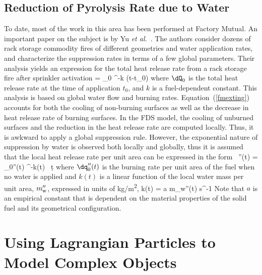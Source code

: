 \subsection{Reduction of Pyrolysis Rate due to Water}

To date, most of the work in this area has been performed at Factory Mutual. An important paper on the subject is by Yu {\em et al.}~\cite{Yu:1}. The authors consider dozens of rack storage commodity fires of different geometries and water application rates, and characterize the suppression rates in terms of a few global parameters. Their analysis yields an expression for the total heat release rate from a rack storage fire after sprinkler activation
\be
   \dQ = \dQ_0 \; ^{-k (t-t_0)}  \label{fmexting}
\ee
where $\dQ_0$ is the total heat release rate at the time of application $t_0$, and $k$ is a fuel-dependent constant. This analysis is based on global water flow and burning rates. Equation~(\ref{fmexting}) accounts for both the cooling of non-burning surfaces as well as the decrease in heat release rate of burning surfaces. In the FDS model, the cooling of unburned surfaces and the reduction in the heat release rate are computed locally. Thus, it is awkward to apply a global suppression rule. However, the exponential nature of suppression by water is observed both locally and globally, thus it is assumed that the local heat release rate per unit area can be expressed in the form~\cite{Hamins:1,Hamins:IAFSS2002}
\be
   \dq''(t) = \dq_0''(t) \; ^{-\int k(t) \, \d t}
\label{nistexting} \ee
where $\dq_0''(t)$ is the burning rate per unit area of the fuel when no water is applied and $k(t)$ is a linear function of the local water mass per unit area, $m_{\rm w}''$, expressed in units of \unit{kg/m^2},
\be
   k(t) = a \; m_{\rm w}''(t) \quad   \hbox{s}^{-1}
\ee
Note that $a$ is an empirical constant that is dependent on the material properties of the solid fuel and its geometrical configuration.



\section{Using Lagrangian Particles to Model Complex Objects}
\label{rad_part_absorb}


